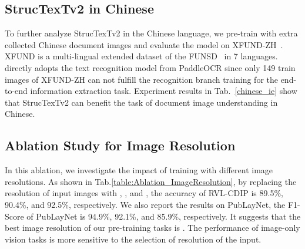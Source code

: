 \documentclass{article} \usepackage{iclr2023_conference,times}
\begin{document}
\subsection{StrucTexTv2 in Chinese}
To further analyze StrucTexTv2 in the Chinese language, we pre-train  with extra collected Chinese document images and evaluate the model on XFUND-ZH~\cite{XuL0WLFZW22}. XFUND is a multi-lingual extended dataset of the FUNSD~\cite{jaume2019funsd} in 7 languages.  directly adopts the text recognition model from PaddleOCR since only 149 train images of XFUND-ZH can not fulfill the recognition branch training for the end-to-end information extraction task. Experiment results in Tab.~\ref{chinese_ie} show that StrucTexTv2 can benefit the task of document image understanding in Chinese.

\begin{table}[ht]
\caption{Experimental results on XFUND-ZH. We re-implement  with PaddleOCR to provide OCR results. The Normalized Edit Distance (1-NED) is used to evaluate for the end-to-end information extraction task.}
\label{chinese_ie}
\vspace{-0.5em}
\begin{center}
\end{center}
\vspace{-0.5em}
\end{table}


\subsection{Ablation Study for Image Resolution}
In this ablation, we investigate the impact of training with different image resolutions. As shown in Tab.\ref{table:Ablation_ImageResolution}, by replacing the resolution of input images with , , and , the accuracy of RVL-CDIP is 89.5\%, 90.4\%, and 92.5\%, respectively. We also report the results on PubLayNet, the F1-Score of PubLayNet is 94.9\%, 92.1\%, and 85.9\%, respectively. It suggests that the best image resolution of our pre-training tasks is . The performance of image-only vision tasks is more sensitive to the selection of resolution of the input.
\end{document}

